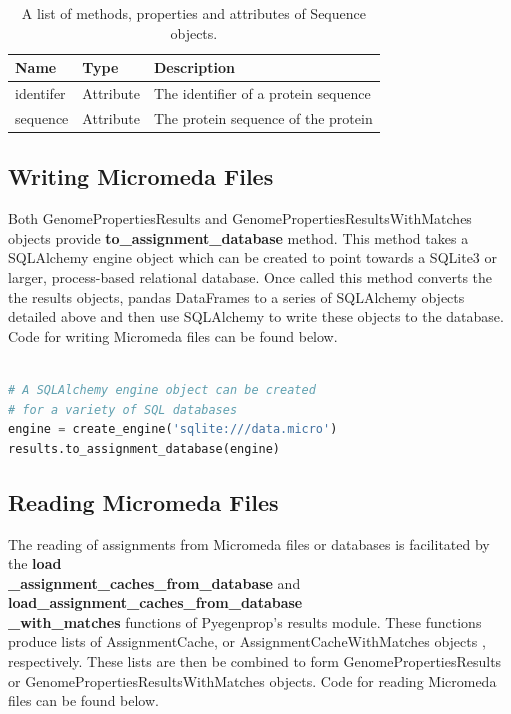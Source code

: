 \begin{table}[!ht]
\centering
\caption{A list of methods, properties and attributes of Sequence objects.}
\label{tab:sequenceobject}
\begin{tabular}{|p{2.7cm}|p{2cm}|p{10cm}|}
\hline
\textbf{Name} & \textbf{Type} & \textbf{Description} \\ \hline
identifer & Attribute & The identifier of a protein sequence \\ \hline
sequence & Attribute & The protein sequence of the protein \\ \hline
\end{tabular}
\end{table}

\subsection{Writing Micromeda Files}

Both GenomePropertiesResults and GenomePropertiesResultsWithMatches objects provide \textbf{to\_assignment\_database} method. This method takes a SQLAlchemy engine object which can be created to point towards a SQLite3 or larger, process-based relational database. Once called this method converts the the results objects, pandas DataFrames to a series of SQLAlchemy objects detailed above and then use SQLAlchemy to write these objects to the database. Code for writing Micromeda files can be found below.

\begin{lstlisting}[language=Python]  

# A SQLAlchemy engine object can be created
# for a variety of SQL databases
engine = create_engine('sqlite:///data.micro')
results.to_assignment_database(engine)

\end{lstlisting}

\subsection{Reading Micromeda Files}

The reading of assignments from Micromeda files or databases is facilitated by the \textbf{load\\ \_assignment\_caches\_from\_database} and \textbf{load\_assignment\_caches\_from\_database \\ \_with\_matches} functions of Pyegenprop's results module. These functions produce lists of AssignmentCache, or AssignmentCacheWithMatches objects , respectively. These lists are then be combined to form GenomePropertiesResults or GenomePropertiesResultsWithMatches objects. Code for reading Micromeda files can be found below.

